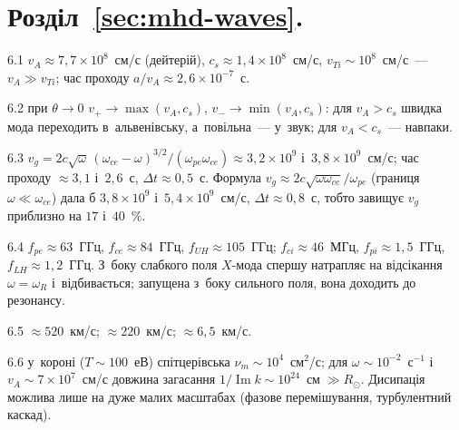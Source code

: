 \protect \section *{Розділ~\ref *{sec:mhd-waves}. }
\begin{Solution}{6.{1}}
		$v_A\approx7{,}7\times10^{8}$~см/с (дейтерій), $c_s\approx1{,}4\times10^{8}$~см/с, $v_{Ti}\sim10^{8}$~см/с~--- $v_A\gg v_{Ti}$; час проходу $a/v_A\approx2{,}6\times10^{-7}$~с.
	
\end{Solution}
\begin{Solution}{6.{2}}
		при $\theta\to0$ $v_+\to\max(v_A,c_s)$, $v_-\to\min(v_A,c_s)$: для $v_A>c_s$ швидка мода
	переходить в~альвенівську, а~повільна~--- у~звук; для $v_A<c_s$~--- навпаки.
	
\end{Solution}
\begin{Solution}{6.{3}}
		$v_g=2c\sqrt{\omega}\,(\omega_{ce}-\omega)^{3/2}/(\omega_{pe}\omega_{ce})\approx3{,}2\times10^{9}$ і~$3{,}8\times10^{9}$~см/с;
		час проходу $\approx3{,}1$ і~$2{,}6$~с, $\Delta t\approx0{,}5$~с. Формула $v_g\approx2c\sqrt{\omega\omega_{ce}}/\omega_{pe}$ (границя $\omega\ll\omega_{ce}$) дала б
		$3{,}8\times10^{9}$ і~$5{,}4\times10^{9}$~см/с, $\Delta t\approx0{,}8$~с, тобто завищує $v_g$ приблизно на $17$ і~$40$~\%.
	
\end{Solution}
\begin{Solution}{6.{4}}
		$f_{pe}\approx63$~ГГц, $f_{ce}\approx84$~ГГц, $f_{UH}\approx105$~ГГц; $f_{ci}\approx46$~МГц,
	$f_{pi}\approx1{,}5$~ГГц, $f_{LH}\approx1{,}2$~ГГц. З~боку слабкого поля $X$-мода спершу натрапляє
	на відсікання $\omega=\omega_R$ і~відбивається; запущена з~боку сильного поля, вона доходить до резонансу.
	
\end{Solution}
\begin{Solution}{6.{5}}
		$\approx520$~км/с; $\approx220$~км/с; $\approx6{,}5$~км/с.
	
\end{Solution}
\begin{Solution}{6.{6}}
		у~короні ($T\sim100$~еВ) спітцерівська $\nu_m\sim10^{4}$~см$^2$/с; для $\omega\sim10^{-2}$~с$^{-1}$
	і~$v_A\sim7\times10^{7}$~см/с довжина загасання $1/\operatorname{Im}k\sim10^{24}$~см$\;\gg R_\odot$. Дисипація
	можлива лише на дуже малих масштабах (фазове перемішування, турбулентний каскад).
	
\end{Solution}
